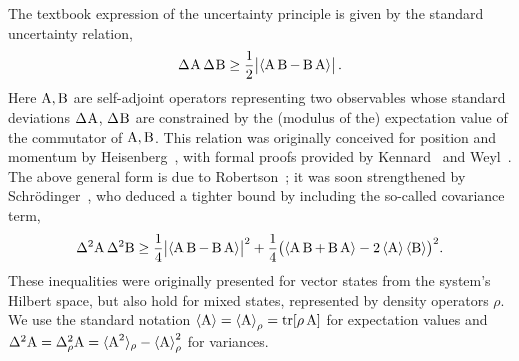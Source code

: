 The textbook expression of the uncertainty principle is given by the standard uncertainty relation,
\begin{equation}\label{eq:HUR}
  \sdev{\opa}\,\sdev{\opb}\ge \frac12\bigl| \expnr{\comm{\opa}{\opb}}\bigr|\,.
\end{equation}
Here $\operatorname{A},\operatorname{B}$ are self-adjoint operators representing two observables whose standard deviations $\sdev{\opa}$, $\sdev{\opb}$ are constrained by the (modulus of the) expectation value of the commutator of $\operatorname{A},\operatorname{B}$. This relation was originally conceived for position and momentum by Heisenberg~\cite{Heisenberg1927-Wheeler+Zurek}, with formal proofs provided by Kennard~\cite{Kennard1927} and Weyl~\cite{Weyl1927}. The above general form is due to Robertson~\cite{Robertson1929}; it was soon strengthened by Schr\"odinger~\cites{Schrodinger1930}{Schrodinger1930Translation}, who deduced a tighter bound by including the so-called covariance term,
\begin{equation}\label{eq:SUR}
  \var{\opa}\,\var{\opb}\ge\frac14\bigl| \expnr{\comm{\opa}{\opb}} \bigr|^2 + \frac14\bigl(\expnr{\acom\opa\opb}-2\expnr{\opa}\expnr{\opb}\bigr)^2.
\end{equation}
These inequalities were originally presented for vector states from the system's Hilbert space, but also hold for mixed states, represented by density operators $\rho$. We use the standard notation $\left\langle {\operatorname{A}}\right\rangle=\left\langle {\operatorname{A}}\right\rangle_\rho =\operatorname{tr}[\rho\operatorname{A}]$ for expectation values and $\var{\opa}=\varr{\opa}=\langle\opa^2\rangle_\rho-\expr{\opa}^2$ for variances. 

